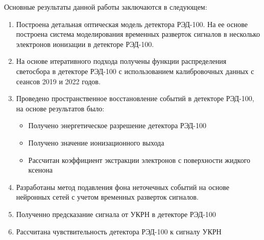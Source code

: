 Основные результаты данной работы заключаются в следующем:
\begin{enumerate}
  \item Построена детальная оптическая модель детектора РЭД-100. На ее основе построена система моделирования временных разверток сигналов в несколько электронов ионизации в детекторе РЭД-100.
  \item На основе итеративного подхода получены функции распределения светосбора в детекторе РЭД-100 с использованием калибровочных данных с сеансов 2019 и 2022 годов. 
  \item Проведено пространственное восстановление событий в детекторе РЭД-100, на основе результатов было:
  \begin{itemize}
      \item Получено энергетическое разрешение детектора РЭД-100
      \item Получено значение ионизационного выхода
      \item Рассчитан коэффициент экстракции электронов с поверхности жидкого ксенона
  \end{itemize}
  \item Разработаны метод подавления фона неточечных событий на основе нейронных сетей с учетом временных разверток сигналов.
  \item Полученно предсказание сигнала от УКРН в детекторе РЭД-100
  \item Рассчитана чувствительность детектора РЭД-100 к сигналу УКРН
\end{enumerate}